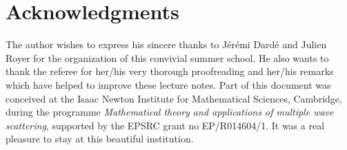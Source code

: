 \documentclass[11pt,a4paper]{report}
\begin{document}
\chapter*{Acknowledgments}
The author wishes to express his sincere thanks to J\'er\'emi Dard\'e and Julien Royer for the organization of this convivial  summer school. He also wants to thank the referee for her/his very thorough proofreading and her/his remarks which have helped to improve these lecture notes. Part of this document was conceived at the Isaac Newton Institute for Mathematical Sciences, Cambridge, during the programme \textit{Mathematical theory and applications of multiple wave scattering}, supported by the EPSRC grant no EP/R014604/1. It was a real pleasure to stay at this beautiful institution.




\end{document}
